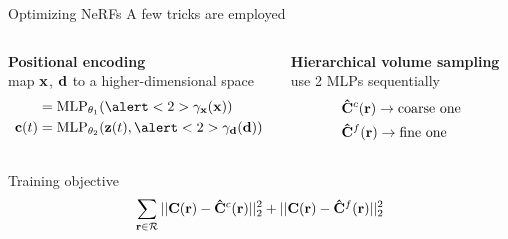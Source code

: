 \documentclass[aspectratio=1610]{beamer}
\begin{document}
\begin{frame}{Optimizing NeRFs}
    A few tricks are employed
    \bigskip
    \pause
    \begin{columns}[t]
        \begin{column}{.42\textwidth}
            \textbf{Positional encoding}\\
            map \(\vb{x}\), \(\vb{d}\) to a higher-dimensional space
            \begin{align*}
                [\sigma(t), \vb{z}(t)] & = \textrm{MLP}_{\theta_1} (\alert<2>{\gamma}_{\vb{x}}(\vb{x})) \\
                \vb{c}(t) & = \textrm{MLP}_{\theta_2} (\vb{z}(t), \alert<2>{\gamma}_{\vb{d}}(\vb{d}))
            \end{align*}
        \end{column}
        \pause
        \begin{column}{.42\textwidth}
            \textbf{Hierarchical volume sampling}\\
            use 2 MLPs sequentially
            \begin{align*}
                &\vb{\hat{C}}^c(\vb{r}) \rightarrow \textrm{coarse one}\\
                &\vb{\hat{C}}^f(\vb{r}) \rightarrow \textrm{fine one}
            \end{align*}
        \end{column}
    \end{columns}
    \bigskip
    \pause
    \begin{block}{Training objective}
        \begin{equation}
            \sum_{\vb{r} \in \mathcal{R}} ||\vb{C}(\vb{r}) - \vb{\hat{C}}^c(\vb{r})||_2^2 + ||\vb{C}(\vb{r}) - \vb{\hat{C}}^f(\vb{r})||_2^2
        \end{equation}
    \end{block}
\end{frame}
\end{document}
